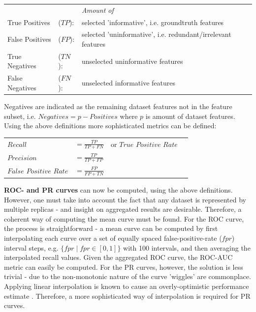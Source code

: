 \documentclass{article}
\begin{document}
\begin{table}[ht]
\begin{tabular}{llll}
 &  & \textit{Amount of} \\
True Positives & ($TP$): & selected 'informative', i.e. groundtruth features \\
False Positives & ($FP$): & selected 'uninformative', i.e. redundant/irrelevant features \\
True Negatives & ($TN$): & unselected uninformative features \\
False Negatives & ($FN$): & unselected informative features \\
\end{tabular}
\end{table}

Negatives are indicated as the remaining dataset features not in the feature subset, i.e. $Negatives = p - Positives$ where $p$ is amount of dataset features. Using the above definitions more sophisticated metrics can be defined:

\begin{table}[ht]
\begin{tabular}{llll}
$Recall$ & $= \frac{TP}{TP+FN}$ & or $True$ $Positive$ $Rate$&  \\
$Precision$ & $= \frac{TP}{TP+FP}$ &  &  \\
$False$ $Positive$ $Rate$ & $= \frac{FP}{FP+TN}$ &  & 
\end{tabular}
\end{table}

\textbf{ROC- and PR curves} can now be computed, using the above definitions. However, one must take into account the fact that any dataset is represented by multiple replicas - and insight on aggregated results are desirable. Therefore, a coherent way of computing the mean curve must be found. For the ROC curve, the process is straightforward - a mean curve can be computed by first interpolating each curve over a set of equally spaced false-positive-rate ($fpr$) interval steps, e.g. $\{fpr \mid fpr \in [0, 1]\}$ with 100 intervals, and then averaging the interpolated recall values. Given the aggregated ROC curve, the ROC-AUC metric can easily be computed. For the PR curves, however, the solution is less trivial - due to the non-monotonic nature of the curve 'wiggles' are commonplace. Applying linear interpolation is known to cause an overly-optimistic performance estimate \citep{davis2006relationship}. Therefore, a more sophisticated way of interpolation is required for PR curves.
\end{document}
